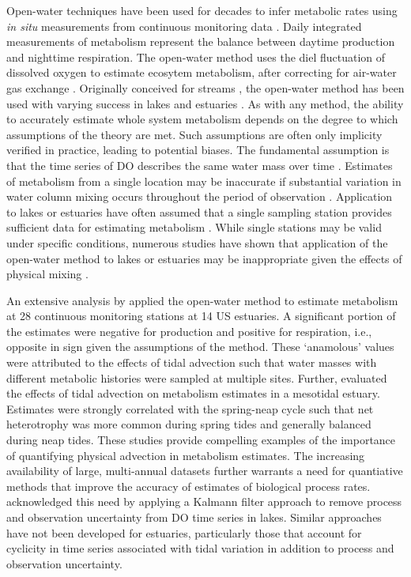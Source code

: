 \documentclass[letterpaper,12pt,oneside]{article}\usepackage[]{graphicx}\usepackage[]{color}
\begin{document}
Open-water techniques have been used for decades to infer metabolic rates using \textit{in situ} measurements from continuous monitoring data \citep{Odum56}. Daily integrated measurements of metabolism represent the balance between daytime production and nighttime respiration.  The open-water method uses the diel fluctuation of dissolved oxygen to estimate ecosytem metabolism, after correcting for air-water gas exchange \citep{Kemp12}.  Originally conceived for streams \citep{Odum56}, the open-water method has been used with varying success in lakes \citep{Staehr10,Coloso11,Batt12} and estuaries \citep{Caffrey04,Hopkinson05,Caffrey13}.  As with any method, the ability to accurately estimate whole system metabolism depends on the degree to which assumptions of the theory are met.  Such assumptions are often only implicity verified in practice, leading to potential biases.  The fundamental assumption is that the time series of \ac{DO} describes the same water mass over time \citep{Needoba12}.  Estimates of metabolism from a single location may be inaccurate if substantial variation in water column mixing occurs throughout the period of observation \citep{Russell07}.  Application to lakes or estuaries have often assumed that a single sampling station provides sufficient data for estimating metabolism \cite{Staehr10}.  While single stations may be valid under specific conditions, numerous studies have shown that application of the open-water method to lakes or estuaries may be inappropriate given the effects of physical mixing \citep{Ziegler98,Caffrey03,Coloso11,Batt12,Nidzieko14}.  

An extensive analysis by \citet{Caffrey03} applied the open-water method to estimate metabolism at 28 continuous monitoring stations at 14 US estuaries.  A significant portion of the estimates were negative for production and positive for respiration, i.e., opposite in sign given the assumptions of the method.  These `anamolous' values were attributed to the effects of tidal advection such that water masses with different metabolic histories were sampled at multiple sites. Further, \citet{Nidzieko14} evaluated the effects of tidal advection on metabolism estimates in a mesotidal estuary.  Estimates were strongly correlated with the spring-neap cycle such that net heterotrophy was more common during spring tides and generally balanced during neap tides. These studies provide compelling examples of the importance of quantifying physical advection in metabolism estimates.  The increasing availability of large, multi-annual datasets further warrants a need for quantiative methods that improve the accuracy of estimates of biological process rates.  \citet{Batt12} acknowledged this need by applying a Kalmann filter approach \citep{Harvey89} to remove process and observation uncertainty from \ac{DO} time series in lakes.  Similar approaches have not been developed for estuaries, particularly those that account for cyclicity in time series associated with tidal variation in addition to process and observation uncertainty.
\end{document}
